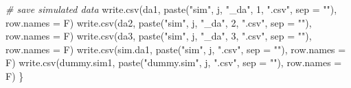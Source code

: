 \documentclass[
  12pt,
]{krantz}
\makeatletter
\newenvironment{Shaded}{\begin{snugshade}}{\end{snugshade}}
\newcommand{\AttributeTok}[1]{\textcolor[rgb]{0.61,0.61,0.61}{#1}}
\newcommand{\CommentTok}[1]{\textcolor[rgb]{0.37,0.37,0.37}{\textit{#1}}}
\newcommand{\DecValTok}[1]{\textcolor[rgb]{0.06,0.06,0.06}{#1}}
\newcommand{\FunctionTok}[1]{\textcolor[rgb]{0,0,0}{#1}}
\newcommand{\NormalTok}[1]{#1}
\newcommand{\StringTok}[1]{\textcolor[rgb]{0.5,0.5,0.5}{#1}}
\newenvironment{kframe}{%
\medskip{}
\setlength{\fboxsep}{.8em}
 \def\at@end@of@kframe{}%
 \ifinner\ifhmode%
  \def\at@end@of@kframe{\end{minipage}}%
  \begin{minipage}{\columnwidth}%
 \fi\fi%
 \def\FrameCommand##1{\hskip\@totalleftmargin \hskip-\fboxsep
 \colorbox{shadecolor}{##1}\hskip-\fboxsep
     \hskip-\linewidth \hskip-\@totalleftmargin \hskip\columnwidth}%
 \MakeFramed {\advance\hsize-\width
   \@totalleftmargin\z@ \linewidth\hsize
   \@setminipage}}%
 {\par\unskip\endMakeFramed%
 \at@end@of@kframe}
\renewenvironment{Shaded}{\begin{kframe}}{\end{kframe}}
\makeatother
\begin{document}
\begin{Shaded}
\begin{Highlighting}[]
    \CommentTok{\# save simulated data}
    \FunctionTok{write.csv}\NormalTok{(da1, }\FunctionTok{paste}\NormalTok{(}\StringTok{"sim"}\NormalTok{, j, }\StringTok{"\_da"}\NormalTok{, }\DecValTok{1}\NormalTok{, }\StringTok{".csv"}\NormalTok{, }\AttributeTok{sep =} \StringTok{""}\NormalTok{), }
        \AttributeTok{row.names =}\NormalTok{ F)}
    \FunctionTok{write.csv}\NormalTok{(da2, }\FunctionTok{paste}\NormalTok{(}\StringTok{"sim"}\NormalTok{, j, }\StringTok{"\_da"}\NormalTok{, }\DecValTok{2}\NormalTok{, }\StringTok{".csv"}\NormalTok{, }\AttributeTok{sep =} \StringTok{""}\NormalTok{), }
        \AttributeTok{row.names =}\NormalTok{ F)}
    \FunctionTok{write.csv}\NormalTok{(da3, }\FunctionTok{paste}\NormalTok{(}\StringTok{"sim"}\NormalTok{, j, }\StringTok{"\_da"}\NormalTok{, }\DecValTok{3}\NormalTok{, }\StringTok{".csv"}\NormalTok{, }\AttributeTok{sep =} \StringTok{""}\NormalTok{), }
        \AttributeTok{row.names =}\NormalTok{ F)}
    \FunctionTok{write.csv}\NormalTok{(sim.da1, }\FunctionTok{paste}\NormalTok{(}\StringTok{"sim"}\NormalTok{, j, }\StringTok{".csv"}\NormalTok{, }\AttributeTok{sep =} \StringTok{""}\NormalTok{), }
        \AttributeTok{row.names =}\NormalTok{ F)}
    \FunctionTok{write.csv}\NormalTok{(dummy.sim1, }\FunctionTok{paste}\NormalTok{(}\StringTok{"dummy.sim"}\NormalTok{, j, }\StringTok{".csv"}\NormalTok{, }
        \AttributeTok{sep =} \StringTok{""}\NormalTok{), }\AttributeTok{row.names =}\NormalTok{ F)}
\NormalTok{\}}
\end{Highlighting}
\end{Shaded}


  

\backmatter
\printindex
\end{document}

